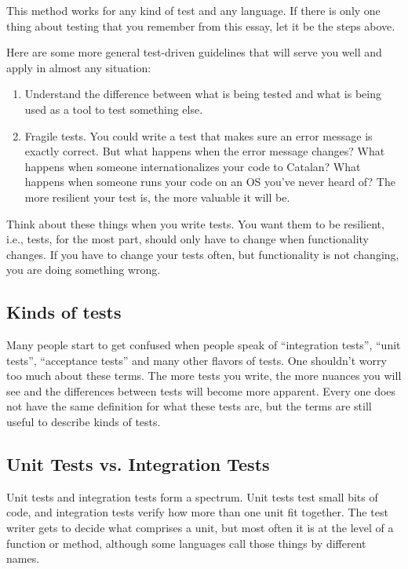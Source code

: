 This method works for any kind of test and any language. If there is only one thing about testing that you remember from this essay, let it be the steps above.

Here are some more general test-driven guidelines that will serve you well and apply in almost any situation:
\begin{enumerate}
 \item Understand the difference between what is being tested and what is being used as a tool to test something else.
 \item Fragile tests. You could write a test that makes sure an error message is exactly correct. But what happens when the error message changes? What happens when someone internationalizes your code to Catalan? What happens when someone runs your code on an OS you've never heard of? The more resilient your test is, the more valuable it will be.
\end{enumerate}

Think about these things when you write tests. You want them to be resilient, i.e., tests, for the most part, should only have to change when functionality changes. If you have to change your tests often, but functionality is not changing, you are doing something wrong.

\subsection*{Kinds of tests}

Many people start to get confused when people speak of ``integration tests'', ``unit tests'', ``acceptance tests'' and many other flavors of tests. One shouldn't worry too much about these terms. The more tests you write, the more nuances you will see and the differences between tests will become more apparent. Every one does not have the same definition for what these tests are, but the terms are still useful to describe kinds of tests.

\subsection*{Unit Tests vs. Integration Tests}

Unit tests and integration tests form a spectrum. Unit tests test small bits of code, and integration tests verify how more than one unit fit together. The test writer gets to decide what comprises a unit, but most often it is at the level of a function or method, although some languages call those things by different names.

